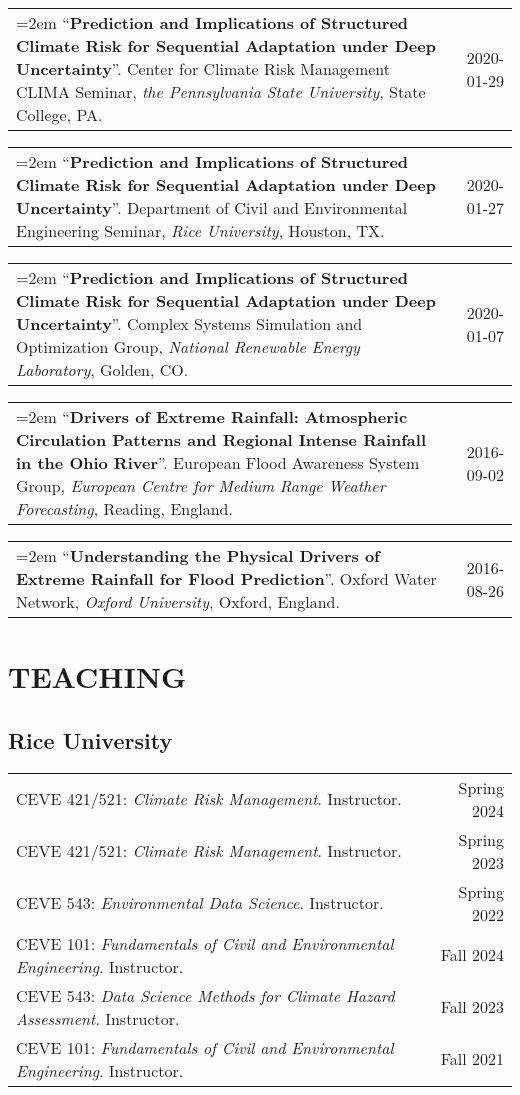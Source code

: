 \documentclass[10pt,oneside]{article}
\makeatletter
\newenvironment{alignedentries}[1][0pt]{%
  \noindent%
  \hspace{#1}%
  \begin{tabular*}{\dimexpr\textwidth-#1\relax}{@{}p{\dimexpr0.85\textwidth-#1\relax}@{\extracolsep{\fill}}r@{}}%
    }{%
  \end{tabular*}%
}
\newenvironment{alignedentrieshang}[1][2em]{%
  \noindent%
}{%
}
\newcommand{\hangingitem}[2]{%
  \noindent%
  \begin{tabular*}{\textwidth}{@{}p{0.85\textwidth}@{\extracolsep{\fill}}r@{}}%
    \hangindent=2em \hangafter=1 #1 & #2%
  \end{tabular*}%
}
\newcommand{\entryitem}[2]{#1 & #2}
\newcommand{\entrybreak}{\\}
\makeatother
\begin{document}
\begin{alignedentrieshang}
\hangingitem{\enquote{\textbf{Prediction and Implications of Structured Climate Risk for Sequential Adaptation under Deep Uncertainty}}. Center for Climate Risk Management CLIMA Seminar,  \textit{the Pennsylvania State University}, State College, PA.}{2020-01-29}

\hangingitem{\enquote{\textbf{Prediction and Implications of Structured Climate Risk for Sequential Adaptation under Deep Uncertainty}}. Department of Civil and Environmental Engineering Seminar,  \textit{Rice University}, Houston, TX.}{2020-01-27}

\hangingitem{\enquote{\textbf{Prediction and Implications of Structured Climate Risk for Sequential Adaptation under Deep Uncertainty}}. Complex Systems Simulation and Optimization Group,  \textit{National Renewable Energy Laboratory}, Golden, CO.}{2020-01-07}

\hangingitem{\enquote{\textbf{Drivers of Extreme Rainfall: Atmospheric Circulation Patterns and Regional Intense Rainfall in the Ohio River}}. European Flood Awareness System Group,  \textit{European Centre for Medium Range Weather Forecasting}, Reading, England.}{2016-09-02}

\hangingitem{\enquote{\textbf{Understanding the Physical Drivers of Extreme Rainfall for Flood Prediction}}. Oxford Water Network,  \textit{Oxford University}, Oxford, England.}{2016-08-26}

\end{alignedentrieshang}


\section{TEACHING}


\subsection{Rice University}
\begin{alignedentries}[2em]

\entryitem{CEVE 421/521: \textit{Climate Risk Management}. Instructor.}{Spring 2024}\entrybreak

\entryitem{CEVE 421/521: \textit{Climate Risk Management}. Instructor.}{Spring 2023}\entrybreak

\entryitem{CEVE 543: \textit{Environmental Data Science}. Instructor.}{Spring 2022}\entrybreak

\entryitem{CEVE 101: \textit{Fundamentals of Civil and Environmental Engineering}. Instructor.}{Fall 2024}\entrybreak

\entryitem{CEVE 543: \textit{Data Science Methods for Climate Hazard Assessment}. Instructor.}{Fall 2023}\entrybreak

\entryitem{CEVE 101: \textit{Fundamentals of Civil and Environmental Engineering}. Instructor.}{Fall 2021}

\end{alignedentries}
\end{document}
